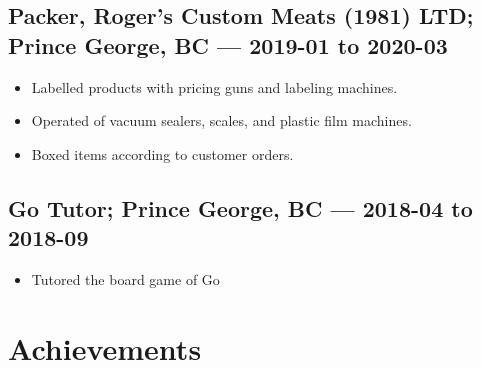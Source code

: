 \documentclass{article}
\begin{document}


\subsection*{Packer, Roger's Custom Meats (1981) LTD; Prince George, BC — 2019-01 to 2020-03}

\begin{itemize}
	\item Labelled products with pricing guns and labeling machines.
	\item Operated of vacuum sealers, scales, and plastic film machines.
	\item Boxed items according to customer orders.
\end{itemize}

\subsection*{Go Tutor; Prince George, BC — 2018-04 to 2018-09}

\begin{itemize}
	\item Tutored the board game of Go
\end{itemize}

\section*{Achievements}
\end{document}
